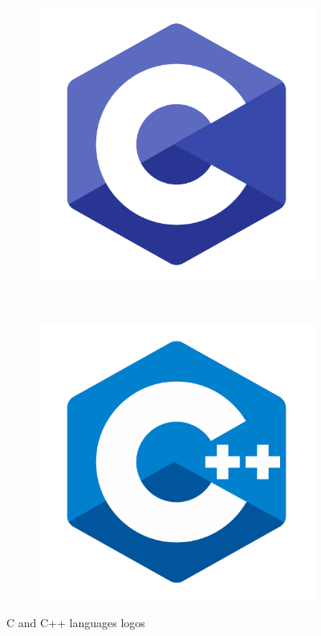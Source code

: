 \documentclass[a4paper,twoside,12pt]{book}
\begin{document}
\begin{figure}[H]
    \centering
    \begin{subfigure}[h]{0.3\textwidth}
        \includegraphics[width=\textwidth]{images/c_logo}
        \label{fig:c}
    \end{subfigure}
    ~
    \begin{subfigure}[h]{0.3\textwidth}
        \includegraphics[width=\textwidth]{images/cpp_logo}
        \label{fig:cpp}
    \end{subfigure}
    \caption{C and C++ languages logos}
    \label{fig:lang}
\end{figure}
\end{document}
